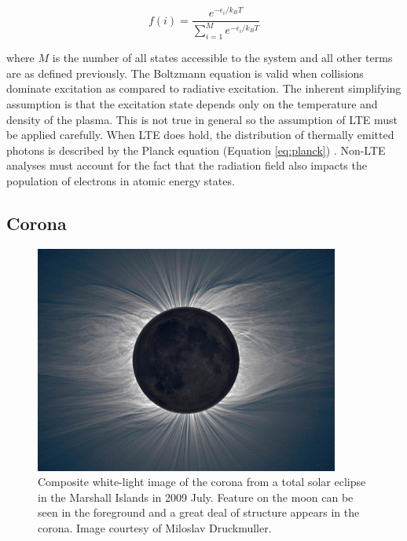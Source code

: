 \begin{equation}
    \label{eq:boltzmann}
    f(i) = \frac{e^{-\epsilon_i / k_BT}}{\sum_{i=1}^M e^{-\epsilon_i / k_BT} }
\end{equation}

\noindent where $M$ is the number of all states accessible to the system and all other terms are as defined previously. The Boltzmann equation is valid when collisions dominate excitation as compared to radiative excitation. The inherent simplifying assumption is that the excitation state depends only on the temperature and density of the plasma. This is not true in general so the assumption of LTE must be applied carefully. When LTE does hold, the distribution of thermally emitted photons is described by the Planck equation (Equation \ref{eq:planck}) . Non-LTE analyses must account for the fact that the radiation field also impacts the population of electrons in atomic energy states. 

\subsection{Corona}

\begin{figure}[!h]
    \begin{center}
	    \includegraphics[width=100mm]{Images/CoronaWhiteLight.png}
    \end{center}
    \caption[Corona in White Light]{
        Composite white-light image of the corona from a total solar eclipse in the Marshall Islands in 2009 July. 
        Feature on the moon can be seen in the foreground and a great deal of structure appears in the corona. 
        Image courtesy of Miloslav Druckmuller. 
    }
    \label{fig:coronawhitelight}
\end{figure}

